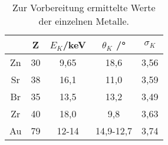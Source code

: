 \begin{table}[H]
  \centering
   \begin{tabular}{c c c c c}
    \toprule
     & Z & $E_{K}$/\;keV & $\theta_{K}$ /\;° & $\sigma_{K}$ \\
    \midrule
    Zn & 30 & 9,65 & 18,6 & 3,56\\
    Sr & 38 & 16,1 & 11,0 & 3,59\\
    Br & 35 & 13,5 & 13,2 & 3,49\\
    Zr & 40 & 18,0 & 9,8 & 3,63\\
    Au & 79 & 12-14 & 14,9-12,7 & 3,74 \\
    \bottomrule
  \end{tabular}
  \caption{Zur Vorbereitung ermittelte Werte der einzelnen Metalle.}
  \label{tab:tabvor}
\end{table}


